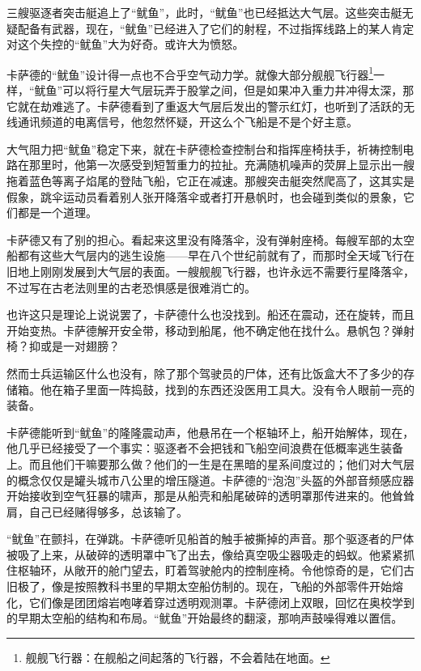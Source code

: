 \documentclass[AutoFakeBold=true]{book}
\begin{document}
\vspace*{1em}

三艘驱逐者突击艇追上了``鱿鱼''，此时，``鱿鱼''也已经抵达大气层。这些突击艇无疑配备有武器，现在，``鱿鱼''已经进入了它们的射程，不过指挥线路上的某人肯定对这个失控的``鱿鱼''大为好奇。或许大为愤怒。

卡萨德的``鱿鱼''设计得一点也不合乎空气动力学。就像大部分舰舰飞行器\footnote{舰舰飞行器：在舰船之间起落的飞行器，不会着陆在地面。}一样，``鱿鱼''可以将行星大气层玩弄于股掌之间，但是如果冲入重力井冲得太深，那它就在劫难逃了。卡萨德看到了重返大气层后发出的警示红灯，也听到了活跃的无线通讯频道的电离信号，他忽然怀疑，开这么个飞船是不是个好主意。

大气阻力把``鱿鱼''稳定下来，就在卡萨德检查控制台和指挥座椅扶手，祈祷控制电路在那里时，他第一次感受到短暂重力的拉扯。充满随机噪声的荧屏上显示出一艘拖着蓝色等离子焰尾的登陆飞船，它正在减速。那艘突击艇突然爬高了，这其实是假象，跳伞运动员看着别人张开降落伞或者打开悬帆时，也会碰到类似的景象，它们都是一个道理。

卡萨德又有了别的担心。看起来这里没有降落伞，没有弹射座椅。每艘军部的太空船都有这些大气层内的逃生设施——早在八个世纪前就有了，而那时全天域飞行在旧地上刚刚发展到大气层的表面。一艘舰舰飞行器，也许永远不需要行星降落伞，不过写在古老法则里的古老恐惧感是很难消亡的。

也许这只是理论上说说罢了，卡萨德什么也没找到。船还在震动，还在旋转，而且开始变热。卡萨德解开安全带，移动到船尾，他不确定他在找什么。悬帆包？弹射椅？抑或是一对翅膀？

然而士兵运输区什么也没有，除了那个驾驶员的尸体，还有比饭盒大不了多少的存储箱。他在箱子里面一阵捣鼓，找到的东西还没医用工具大。没有令人眼前一亮的装备。

卡萨德能听到``鱿鱼''的隆隆震动声，他悬吊在一个枢轴环上，船开始解体，现在，他几乎已经接受了一个事实：驱逐者不会把钱和飞船空间浪费在低概率逃生装备上。而且他们干嘛要那么做？他们的一生是在黑暗的星系间度过的；他们对大气层的概念仅仅是罐头城市八公里的增压隧道。卡萨德的``泡泡''头盔的外部音频感应器开始接收到空气狂暴的啸声，那是从船壳和船尾破碎的透明罩那传进来的。他耸耸肩，自己已经赌得够多，总该输了。

``鱿鱼''在颤抖，在弹跳。卡萨德听见船首的触手被撕掉的声音。那个驱逐者的尸体被吸了上来，从破碎的透明罩中飞了出去，像给真空吸尘器吸走的蚂蚁。他紧紧抓住枢轴环，从敞开的舱门望去，盯着驾驶舱内的控制座椅。令他惊奇的是，它们古旧极了，像是按照教科书里的早期太空船仿制的。现在，飞船的外部零件开始熔化，它们像是团团熔岩咆哮着穿过透明观测罩。卡萨德闭上双眼，回忆在奥校学到的早期太空船的结构和布局。``鱿鱼''开始最终的翻滚，那响声鼓噪得难以置信。
\end{document}
